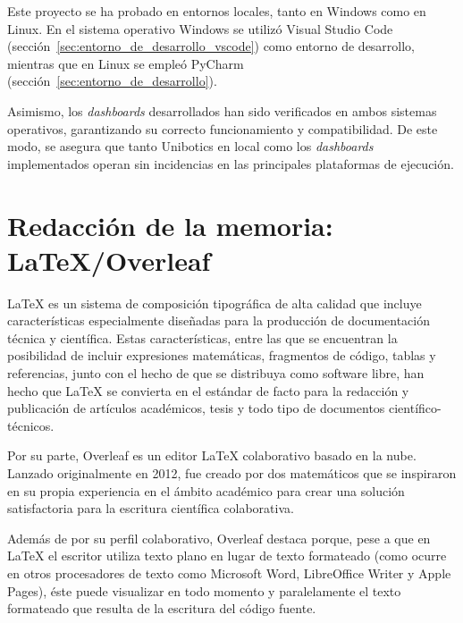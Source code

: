 \documentclass[a4paper, 12pt]{book}
\begin{document}
Este proyecto se ha probado en entornos locales, tanto en Windows como en Linux.  
En el sistema operativo Windows se utilizó Visual Studio Code (sección~\ref{sec:entorno_de_desarrollo_vscode}) como entorno de desarrollo, mientras que en Linux se empleó PyCharm (sección~\ref{sec:entorno_de_desarrollo}).

Asimismo, los \textit{dashboards} desarrollados han sido verificados en ambos sistemas operativos, garantizando su correcto funcionamiento y compatibilidad.  
De este modo, se asegura que tanto Unibotics en local como los \textit{dashboards} implementados operan sin incidencias en las principales plataformas de ejecución.

\section{Redacción de la memoria: LaTeX/Overleaf}
\label{sec:redaccion_de_la_memoria}

LaTeX es un sistema de composición tipográfica de alta calidad que incluye características especialmente diseñadas para la producción de documentación técnica y científica. Estas características, entre las que se encuentran la posibilidad de incluir expresiones matemáticas, fragmentos de código, tablas y referencias, junto con el hecho de que se distribuya como software libre, han hecho que LaTeX se convierta en el estándar de facto para la redacción y publicación de artículos académicos, tesis y todo tipo de documentos científico-técnicos. 

Por su parte, Overleaf es un editor LaTeX colaborativo basado en la nube. Lanzado originalmente en 2012, fue creado por dos matemáticos que se inspiraron en su propia experiencia en el ámbito académico para crear una solución satisfactoria para la escritura científica colaborativa.

Además de por su perfil colaborativo, Overleaf destaca porque, pese a que en LaTeX el escritor utiliza texto plano en lugar de texto formateado (como ocurre en otros procesadores de texto como Microsoft Word, LibreOffice Writer y Apple Pages), éste puede visualizar en todo momento y paralelamente el texto formateado que resulta de la escritura del código fuente.


\cleardoublepage

\end{document}
